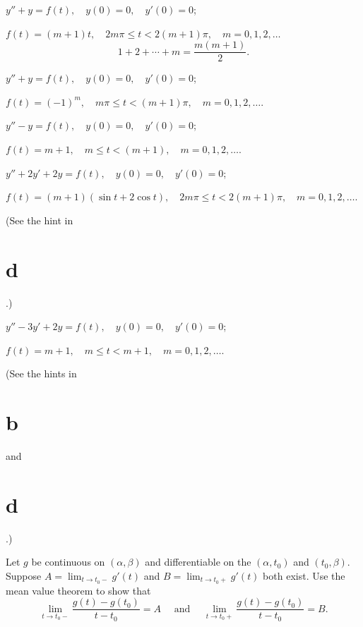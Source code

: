\begin{exerciselist}
\begin{alist}
    \item %
    $y''+y=f(t),\quad y(0)=0,\quad y'(0)=0$;

    $f(t)=(m+1)t,\quad2m\pi\le t<2(m+1)\pi,\quad m=0,1,2,\dots$ 
    \[
      1+2+\cdots+m=\frac{m(m+1)}{2}.
    \]

    \item %
    $y''+y=f(t),\quad y(0)=0,\quad y'(0)=0$;

    $f(t)=(-1)^{m},\quad m\pi\le t<(m+1)\pi,\quad m=0,1,2,\dots$.

    \item %
    $y''-y=f(t),\quad y(0)=0,\quad y'(0)=0$;

    $f(t)=m+1,\quad m\le t<(m+1),\quad m=0,1,2,\dots$.


    \item %
    $y''+2y'+2y=f(t),\quad y(0)=0,\quad y'(0)=0$;

    $f(t)=(m+1)(\sin t+2\cos t),\quad2m\pi\le t<2(m+1)\pi,\quad m=0,1,2,\dots$.

    (See the hint in \part{d}.)

    \item %
    $y''-3y'+2y=f(t),\quad y(0)=0,\quad y'(0)=0$;

    $f(t)=m+1,\quad m\le t<m+1,\quad m=0,1,2,\dots$.

    (See the hints in \part{b} and \part{d}.)
  \end{alist}

  \item\label{exer:8.5.23}
  \begin{alist}
    \item %
    Let $g$ be continuous on $(\alpha,\beta)$ and differentiable on the $(\alpha,t_{0})$ and
    $(t_{0},\beta)$. Suppose $A=\lim_{t\to t_{0}-}g'(t)$ and $B=\lim_{t\to t_{0}+}g'(t)$ both exist.
    Use the mean value theorem to show that
    \[
      \lim_{t\to t_{0}-}\frac{g(t)-g(t_{0})}{t-t_{0}}=A\quad\mbox{ and }\quad \lim_{t\to t_{0}+}\frac{g(t)-g(t_{0})}{t-t_{0}}=B.
    \]


\end{alist}
\end{exerciselist}
